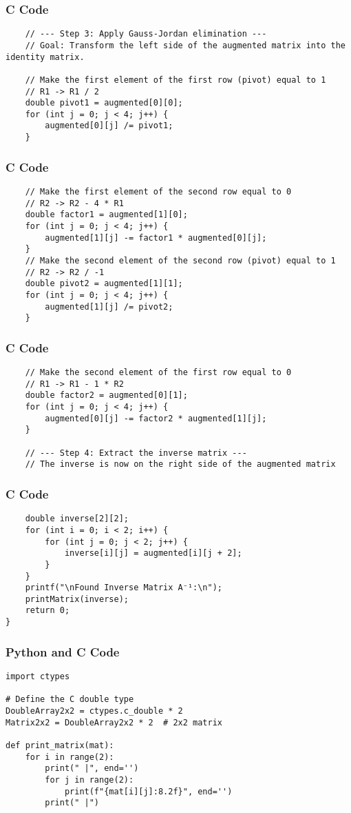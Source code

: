 \documentclass{beamer}
\begin{document}
\begin{frame}[fragile]
\frametitle{C Code}
\begin{lstlisting}
    // --- Step 3: Apply Gauss-Jordan elimination ---
    // Goal: Transform the left side of the augmented matrix into the identity matrix.

    // Make the first element of the first row (pivot) equal to 1
    // R1 -> R1 / 2
    double pivot1 = augmented[0][0];
    for (int j = 0; j < 4; j++) {
        augmented[0][j] /= pivot1;
    }
\end{lstlisting}
\end{frame}

\begin{frame}[fragile]
\frametitle{C Code}
\begin{lstlisting}
    // Make the first element of the second row equal to 0
    // R2 -> R2 - 4 * R1
    double factor1 = augmented[1][0];
    for (int j = 0; j < 4; j++) {
        augmented[1][j] -= factor1 * augmented[0][j];
    }
    // Make the second element of the second row (pivot) equal to 1
    // R2 -> R2 / -1
    double pivot2 = augmented[1][1];
    for (int j = 0; j < 4; j++) {
        augmented[1][j] /= pivot2;
    }
\end{lstlisting}
\end{frame}

\begin{frame}[fragile]
\frametitle{C Code}
\begin{lstlisting}
    // Make the second element of the first row equal to 0
    // R1 -> R1 - 1 * R2
    double factor2 = augmented[0][1];
    for (int j = 0; j < 4; j++) {
        augmented[0][j] -= factor2 * augmented[1][j];
    }

    // --- Step 4: Extract the inverse matrix ---
    // The inverse is now on the right side of the augmented matrix
\end{lstlisting}
\end{frame}

\begin{frame}[fragile]
\frametitle{C Code}
\begin{lstlisting}
    double inverse[2][2];
    for (int i = 0; i < 2; i++) {
        for (int j = 0; j < 2; j++) {
            inverse[i][j] = augmented[i][j + 2];
        }
    }
    printf("\nFound Inverse Matrix A⁻¹:\n");
    printMatrix(inverse);
    return 0;
}
\end{lstlisting}
\end{frame}

\begin{frame}[fragile]
\frametitle{Python and C Code}
\begin{lstlisting}
import ctypes

# Define the C double type
DoubleArray2x2 = ctypes.c_double * 2
Matrix2x2 = DoubleArray2x2 * 2  # 2x2 matrix

def print_matrix(mat):
    for i in range(2):
        print(" |", end='')
        for j in range(2):
            print(f"{mat[i][j]:8.2f}", end='')
        print(" |")
\end{lstlisting}
\end{frame}
\end{document}
